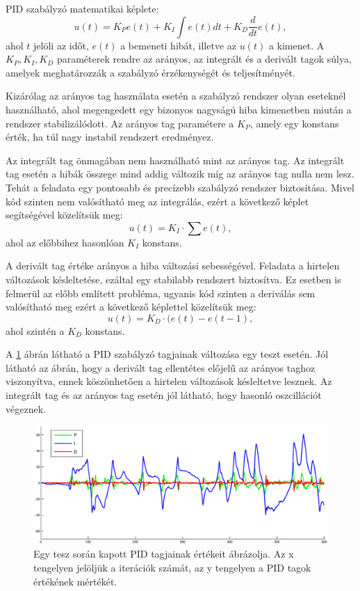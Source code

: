 PID szabályzó matematikai képlete: $$u(t)=K_{P}e(t)+K_{I}\int e(t)dt+K_{D}\frac{d}{dt}e(t),$$ ahol $t$ jelöli az időt, $e(t)$ a bemeneti hibát, illetve az $u(t)$ a kimenet. A $K_{P}, K_{I}, K_{D}$ paraméterek rendre az arányos, az integrált és a derivált tagok súlya, amelyek meghatározzák a szabályzó érzékenységét és teljesítményét.

Kizárólag az arányos tag használata esetén a szabályzó rendszer olyan eseteknél használható, ahol megengedett egy bizonyos nagyságú hiba kimenetben miután a rendszer stabilizálódott. Az arányos tag paramétere a $K_{P}$, amely egy konstans érték, ha túl nagy instabil rendszert eredményez.

Az integrált tag önmagában nem használható mint az arányos tag. Az integrált tag esetén a hibák összege mind addig változik míg az arányos tag nulla nem lesz. Tehát a feladata egy pontosabb és precízebb szabályzó rendszer biztosítása. Mivel kód szinten nem valósítható meg az integrálás, ezért a következő képlet segítségével közelítsük meg:$$u(t)=K_{I}\cdot\sum e(t),$$ ahol az előbbihez hasonlóan $K_{I}$ konstans.

A derivált tag értéke arányos a hiba változási sebességével. Feladata a hirtelen változások késleltetése, ezáltal egy stabilabb rendszert biztosítva. Ez esetben is felmerül az előbb említett probléma, ugyanis kód szinten a deriválás sem valósítható meg ezért a következő képlettel közelítsük meg:$$u(t)=K_{D}\cdot (e(t) - e(t-1),$$ ahol szintén a $K_{D}$ konstans.

A \ref{pidFig} ábrán látható a PID szabályzó tagjainak változása egy teszt esetén. Jól látható az ábrán, hogy a derivált tag ellentétes előjelű az arányos taghoz viszonyítva, ennek köszönhetően a hirtelen változások késleltetve lesznek. Az integrált tag és az arányos tag esetén jól látható, hogy hasonló oszcillációt végeznek.

\begin{figure}[h]
	\centering
	\includegraphics[width=1\linewidth]{images/pid.eps}
	\captionsetup{justification=centering,margin=1.5cm}
	\caption[Egy tesz során kapott PID tagjainak értékeit ábrázolja]
	{Egy tesz során kapott PID tagjainak értékeit ábrázolja. Az x tengelyen jelöljük a iterációk számát,	az y tengelyen a PID tagok értékének mértékét.}
	\label{pidFig}
\end{figure}
